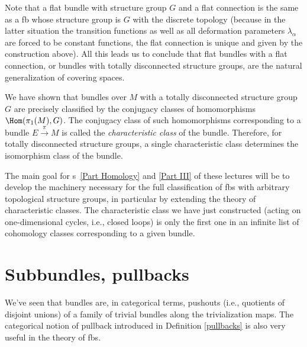 \begin{example}
	Note that a flat bundle with structure group $G$ and a flat connection is the same as a \gls{fb} whose structure group is $G$ with the discrete topology (because in the latter situation the transition functions as well as all deformation parameters $\lambda_\alpha$ are forced to be constant functions, the flat connection is unique and given by the construction above). All this leads us to conclude that flat bundles with a flat connection, or bundles with totally disconnected structure groups, are the natural generalization of covering spaces.
	
	We have shown that bundles over $M$ with a totally disconnected structure group $G$ are precisely classified by the conjugacy classes of homomorphisms $\Hom(\pi_1(M),G)$. The conjugacy class of such homomorphisms corresponding to a bundle $E\overset{\pi}{\to}M$ is called the \emph{characteristic class} of the bundle. Therefore, for totally disconnected structure groups, a single characteristic class determines the isomorphism class of the bundle.
	
	The main goal for \Part s~\ref{Part Homology} and \ref{Part III} of these lectures will be to develop the machinery necessary for the full classification of \glspl{fb} with arbitrary topological structure groups, in particular by extending the theory of characteristic classes. The characteristic class we have just constructed (acting on one-dimensional cycles, i.e., closed loops) is only the first one in an infinite list of cohomology classes corresponding to a given bundle.
\end{example}





\section{Subbundles, pullbacks}


We've seen that bundles are, in categorical terms, pushouts (i.e., quotients of disjoint unions) of a family of trivial bundles along the trivialization maps. The categorical notion of pullback introduced in Definition \ref{pullbacks} is also very useful in the theory of \glspl{fb}.

